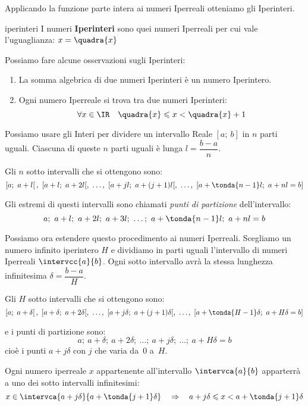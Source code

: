 \vspace{.5em}
Applicando la funzione parte intera ai numeri Iperreali otteniamo gli 
Iperinteri.

\begin{newdef}{}{iperinteri}
I numeri \textbf{Iperinteri} sono quei numeri Iperreali per cui vale 
l'uguaglianza: \qquad
\(x=\quadra{x}\)
\end{newdef}

Possiamo fare alcune osservazioni sugli Iperinteri:

\begin{enumerate} [noitemsep]
\item 
La somma algebrica di due numeri Iperinteri è un numero Iperintero.
\item 
Ogni numero Iperreale si trova tra due numeri Iperinteri:
\[\forall x \in \IR \quad \quadra{x} \leqslant x < \quadra{x}+1\]
\end{enumerate}

Possiamo usare gli Interi per dividere un intervallo Reale \([a;~b]\)
in \(n\) parti uguali. Ciascuna di queste \(n\) parti 
uguali è lunga \(l=\dfrac{b-a}{n}\).

Gli \(n\) sotto intervalli che si ottengono sono:
\[\left[a;~a+l \right[,~[a+l;~a+2l[,~\dots,~
[a+jl;~a+(j+1)l[,~\dots,~
[a+\tonda{n-1}l;~a+nl=b]\]

Gli estremi di questi intervalli sono chiamati \emph{punti di partizione} 
dell'intervallo:
\[a;~a+l;~a+2l;~a+3l;~\dots;~a+\tonda{n-1}l;~a+nl=b\]

Possiamo ora estendere questo procedimento ai numeri Iperreali.
Scegliamo un numero infinito iperintero \(H\) e dividiamo in parti 
uguali l'intervallo di numeri Iperreali \(\intervcc{a}{b}\). Ogni 
sotto intervallo avrà la stessa lunghezza infinitesima 
\(\delta=\dfrac{b-a}{H}\).

Gli \(H\) sotto intervalli che si ottengono sono:
\[\left[a;~a+\delta \right[,~[a+\delta;~a+2\delta[,~\dots,~
[a+j\delta;~a+(j+1)\delta[,~\dots,~
[a+\tonda{H-1}\delta;~a+H\delta=b]\]

e i punti di partizione sono:
\[a;~a+\delta;~a+2\delta;~\dots;~a+j\delta;~\dots;~a+H\delta=b\]
cioè i punti \(a+j\delta\) con \(j\) che varia da~0 a~\(H\).

Ogni numero iperreale \(x\) appartenente all'intervallo \(\intervca{a}{b}\)
apparterrà a uno dei sotto intervalli infinitesimi:
\[x \in \intervca{a+j\delta}{a+\tonda{j+1}\delta} \quad \Rightarrow \quad 
  a+j\delta \leqslant x < a+\tonda{j+1}\delta\]

